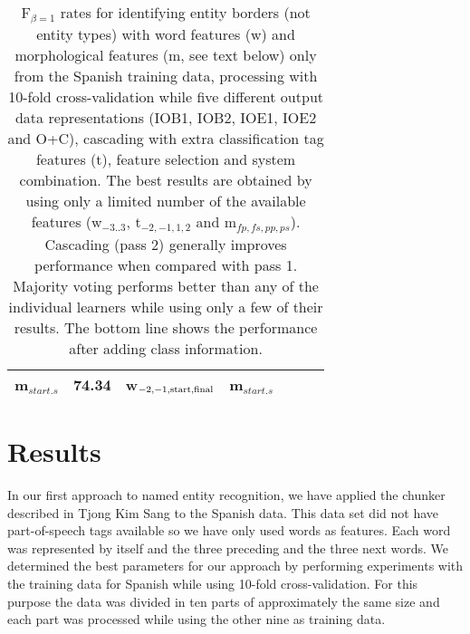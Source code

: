 \documentclass[10pt]{article}
\begin{document}
\begin{table*}[t]
\begin{center}
\begin{tabular}{|l|c|ll|c|lll|}
                          m$_{start.s}$
                & 74.34 & \multicolumn{2}{l}{w$_{{\rm -2,-1,start,final}}$}
                        & m$_{start.s}$\\\hline
\end{tabular}
\label{tab-wordsandmorph}
\caption{
F$_{\beta=1}$ rates for identifying entity borders (not entity types)
with word features (w) and morphological features (m, see text below)
only from the Spanish training data, processing with 10-fold
cross-validation while five different output data representations
(IOB1, IOB2, IOE1, IOE2 and O+C), cascading with extra classification
tag features (t), feature selection and system combination. 
The best results are obtained by using only a limited number of the
available features (w$_{-3..3}$, t$_{-2,-1,1,2}$ and
m$_{fp,fs,pp,ps}$). 
Cascading (pass 2) generally improves performance when compared
with pass 1.
Majority voting performs better than any of the individual learners
while using only a few of their results.
The bottom line shows the performance after adding class information.
}
\end{center}
\end{table*}

\section{Results}

In our first approach to named entity recognition, we have applied
the chunker described in Tjong Kim Sang  to the
Spanish data.
This data set did not have part-of-speech tags available so we have
only used words as features.
Each word was represented by itself and the three preceding and the
three next words.
We determined the best parameters for our approach by performing
experiments with the training data for Spanish while using 10-fold
cross-validation.
For this purpose the data was divided in ten parts of approximately
the same size and each part was processed while using the other nine
as training data.
\end{document}
